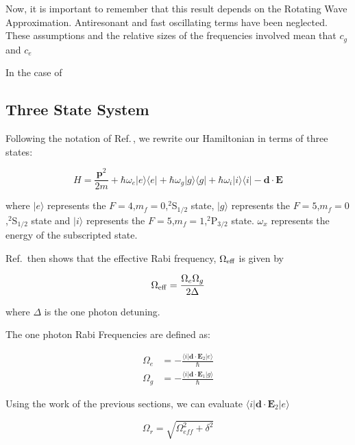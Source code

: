 Now, it is important to remember that this result depends on the Rotating Wave Approximation. Antiresonant and fast oscillating terms have been neglected. These assumptions and the relative sizes of the frequencies involved mean that $c_g$ and $c_e$



In the case of 

\subsection{Three State System}
Following the notation of Ref.\,\cite{Young1997363}, we rewrite our Hamiltonian in terms of three states:

\begin{equation}
H=\frac{\mathbf{p}^2}{2m} + 
\hbar\omega_e |e\rangle\langle e | +
\hbar\omega_g |g\rangle\langle g | +
\hbar\omega_i |i\rangle\langle i | -
\mathbf{d}\cdot\mathbf{E}
\end{equation}

where $|e\rangle$ represents the $F=4$,$m_f=0$,$^2$S$_{1/2}$ state, $|g\rangle$ represents the $F=5$,$m_f=0$,$^2$S$_{1/2}$ state and $|i\rangle$ represents the $F=5$,$m_f=1$,$^2$P$_{3/2}$ state. $\omega_x$ represents the energy of the subscripted state.

Ref.\,\cite{Young1997363} then shows that the effective Rabi frequency, $\Omega_{\textnormal{eff}}$ is given by 

\begin{equation}
\Omega_{\rm eff}=\frac{\Omega_{e} \Omega_{g}}{2 \Delta}
\end{equation}

where $\Delta$ is the one photon detuning. %

The one photon Rabi Frequencies are defined as:

\begin{align}
\Omega_e&=-\frac{\langle i | \mathbf{d}\cdot \mathbf{E}_2 | e\rangle }{\hbar}\\
\Omega_g&=-\frac{\langle i | \mathbf{d}\cdot \mathbf{E}_1 | g\rangle}{\hbar}
\end{align}

Using the work of the previous sections, we can evaluate $\langle i | \mathbf{d}\cdot \mathbf{E}_2 | e\rangle$

\begin{equation}
\Omega_\mathit{r}=\sqrt{\Omega_\mathit{eff}^2+\delta^2}
\end{equation}

